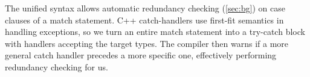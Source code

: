 The unified syntax allows automatic 
redundancy checking (\textsection\ref{sec:bg}) on case clauses of a match statement.
C++ catch-handlers use first-fit 
semantics in handling exceptions, so we turn an entire match statement into a 
try-catch block with handlers accepting the target types. 
The compiler then warns if a more general catch handler precedes a more 
specific one, effectively performing redundancy checking for us.

%
%
%
%
%
